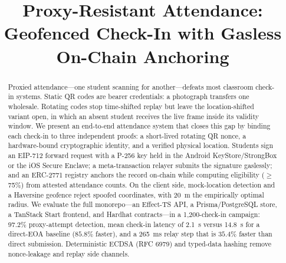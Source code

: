 \documentclass[conference]{IEEEtran}
\begin{document}
\title{Proxy-Resistant Attendance: Geofenced Check-In with Gasless On-Chain Anchoring}

\author{
}

\maketitle

\begin{abstract}
Proxied attendance---one student scanning for another---defeats most classroom
check-in systems. Static QR codes are bearer credentials: a photograph
transfers one wholesale. Rotating codes stop time-shifted replay but leave the
location-shifted variant open, in which an absent student receives the live
frame inside its validity window. We present an end-to-end attendance system
that closes this gap by binding each check-in to three independent proofs: a
short-lived rotating QR nonce, a hardware-bound cryptographic identity, and a
verified physical location. Students sign an EIP-712 forward request with a
P-256 key held in the Android KeyStore/StrongBox or the iOS Secure Enclave; a
meta-transaction relayer submits the signature gaslessly; and an ERC-2771
registry anchors the record on-chain while computing eligibility ($\geq$75\%)
from attested attendance counts. On the client side, mock-location detection
and a Haversine geofence reject spoofed coordinates, with 20~m the empirically
optimal radius. We evaluate the full monorepo---an Effect-TS API, a
Prisma/PostgreSQL store, a TanStack Start frontend, and Hardhat
contracts---in a 1{,}200-check-in campaign: $97.2\%$ proxy-attempt detection,
mean check-in latency of 2.1~s versus 14.8~s for a direct-EOA baseline
($85.8\%$ faster), and a 265~ms relay step that is $35.4\%$ faster than direct
submission. Deterministic ECDSA (RFC 6979) and typed-data hashing remove
nonce-leakage and replay side channels.
\end{abstract}
\end{document}
